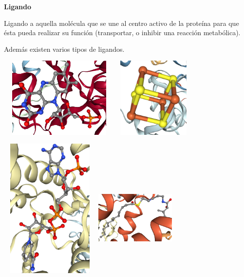 \documentclass[a4paper]{article}
\begin{document}
\noindent\textbf{Ligando}

Ligando a aquella molécula que se une al centro activo de la proteína para que ésta pueda realizar su función (transportar, o inhibir una reacción metabólica).

Además existen varios tipos de ligandos.

\begin{center}
	\includegraphics[width=6cm,height=4cm]{ligando1.png}
	\includegraphics[width=4cm,height=4cm]{ligando4.png}
		
\end{center}


\begin{center}
	\includegraphics[width=5cm,height=7cm]{ligando2.png}
	\includegraphics[width=4cm,height=6cm]{ligando3.png}
	
\end{center}
\end{document}
